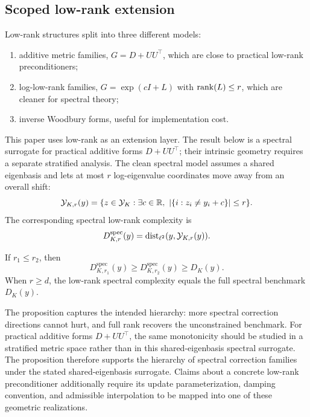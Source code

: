 \subsection{Scoped low-rank extension}

Low-rank structures split into three different models:
\begin{enumerate}[leftmargin=*,itemsep=0.2em]
  \item additive metric families, \(G=D+UU^\top\), which are close to practical
  low-rank preconditioners;
  \item log-low-rank families, \(G=\exp(cI+L)\) with \(\operatorname{rank}(L)\le r\), which
  are cleaner for spectral theory;
  \item inverse Woodbury forms, useful for implementation cost.
\end{enumerate}
This paper uses low-rank as an extension layer. The result below is a spectral
surrogate for practical additive forms \(D+UU^\top\); their intrinsic geometry
requires a separate stratified analysis. The clean spectral model assumes a
shared eigenbasis and lets at most \(r\) log-eigenvalue coordinates move away
from an overall shift:
\[
  \mathcal Y_{K,r}(y)
  =
  \{z\in\mathcal Y_K:\exists c\in\mathbb R,\ |\{i:z_i\ne y_i+c\}|\le r\}.
\]
The corresponding spectral low-rank complexity is
\[
  D_{K,r}^{\mathrm{spec}}(y)=\operatorname{dist}_{\ell^2}(y,\mathcal Y_{K,r}(y)).
\]

\begin{proposition}
\label{prop:lowrank-monotonicity}
If \(r_1\le r_2\), then
\[
  D_{K,r_1}^{\mathrm{spec}}(y)
  \ge
  D_{K,r_2}^{\mathrm{spec}}(y)
  \ge
  D_K(y).
\]
When \(r\ge d\), the low-rank spectral complexity equals the full spectral
benchmark \(D_K(y)\).
\end{proposition}

\begin{remark}
The proposition captures the intended hierarchy: more spectral correction
directions cannot hurt, and full rank recovers the unconstrained benchmark.
For practical additive forms \(D+UU^\top\), the same monotonicity should be
studied in a stratified metric space rather than in this shared-eigenbasis
spectral surrogate.
The proposition therefore supports the hierarchy of spectral correction
families under the stated shared-eigenbasis surrogate. Claims about a concrete
low-rank preconditioner additionally require its update parameterization,
damping convention, and admissible interpolation to be mapped into one of these
geometric realizations.
\end{remark}
